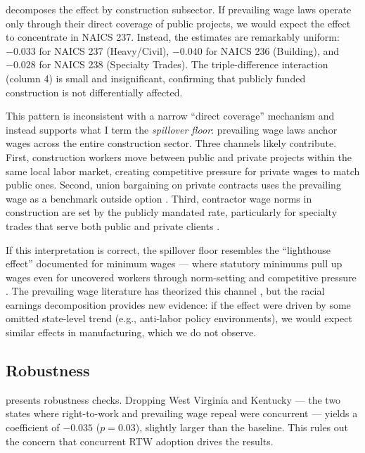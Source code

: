 \documentclass[12pt]{article}
\begin{document}


 decomposes the effect by construction subsector. If prevailing wage laws operate only through their direct coverage of public projects, we would expect the effect to concentrate in NAICS 237. Instead, the estimates are remarkably uniform: $-0.033$ for NAICS 237 (Heavy/Civil), $-0.040$ for NAICS 236 (Building), and $-0.028$ for NAICS 238 (Specialty Trades). The triple-difference interaction (column 4) is small and insignificant, confirming that publicly funded construction is not differentially affected.

This pattern is inconsistent with a narrow ``direct coverage'' mechanism and instead supports what I term the \textit{spillover floor}: prevailing wage laws anchor wages across the entire construction sector. Three channels likely contribute. First, construction workers move between public and private projects within the same local labor market, creating competitive pressure for private wages to match public ones. Second, union bargaining on private contracts uses the prevailing wage as a benchmark outside option \citep{belman2006union}. Third, contractor wage norms in construction are set by the publicly mandated rate, particularly for specialty trades that serve both public and private clients \citep{bilginsoy2013union}.

If this interpretation is correct, the spillover floor resembles the ``lighthouse effect'' documented for minimum wages --- where statutory minimums pull up wages even for uncovered workers through norm-setting and competitive pressure \citep{lee1999wage}. The prevailing wage literature has theorized this channel \citep{azarirad2005economics}, but the racial earnings decomposition provides new evidence: if the effect were driven by some omitted state-level trend (e.g., anti-labor policy environments), we would expect similar effects in manufacturing, which we do not observe.

\subsection{Robustness}




 presents robustness checks. Dropping West Virginia and Kentucky --- the two states where right-to-work and prevailing wage repeal were concurrent --- yields a coefficient of $-0.035$ ($p = 0.03$), slightly larger than the baseline. This rules out the concern that concurrent RTW adoption drives the results.
\end{document}
